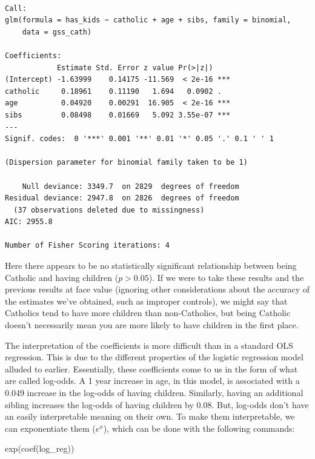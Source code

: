 \documentclass[
  letterpaper,
]{book}
\newenvironment{Shaded}{\begin{snugshade}}{\end{snugshade}}
\newcommand{\FunctionTok}[1]{\textcolor[rgb]{0.28,0.35,0.67}{#1}}
\newcommand{\NormalTok}[1]{\textcolor[rgb]{0.00,0.23,0.31}{#1}}
\begin{document}
\begin{verbatim}

Call:
glm(formula = has_kids ~ catholic + age + sibs, family = binomial, 
    data = gss_cath)

Coefficients:
            Estimate Std. Error z value Pr(>|z|)    
(Intercept) -1.63999    0.14175 -11.569  < 2e-16 ***
catholic     0.18961    0.11190   1.694   0.0902 .  
age          0.04920    0.00291  16.905  < 2e-16 ***
sibs         0.08498    0.01669   5.092 3.55e-07 ***
---
Signif. codes:  0 '***' 0.001 '**' 0.01 '*' 0.05 '.' 0.1 ' ' 1

(Dispersion parameter for binomial family taken to be 1)

    Null deviance: 3349.7  on 2829  degrees of freedom
Residual deviance: 2947.8  on 2826  degrees of freedom
  (37 observations deleted due to missingness)
AIC: 2955.8

Number of Fisher Scoring iterations: 4
\end{verbatim}

Here there appears to be no statistically significant relationship
between being Catholic and having children (\(p > 0.05\)). If we were to
take these results and the previous results at face value (ignoring
other considerations about the accuracy of the estimates we've obtained,
such as improper controls), we might say that Catholics tend to have
more children than non-Catholics, but being Catholic doesn't necessarily
mean you are more likely to have children in the first place.

The interpretation of the coefficients is more difficult than in a
standard OLS regression. This is due to the different properties of the
logistic regression model alluded to earlier. Essentially, these
coefficients come to us in the form of what are called log-odds. A 1
year increase in age, in this model, is associated with a 0.049 increase
in the log-odds of having children. Similarly, having an additional
sibling increases the log-odds of having children by 0.08. But, log-odds
don't have an easily interpretable meaning on their own. To make them
interpretable, we can exponentiate them (\(e^x\)), which can be done
with the following commands:

\begin{Shaded}
\begin{Highlighting}[]
\FunctionTok{exp}\NormalTok{(}\FunctionTok{coef}\NormalTok{(log\_reg))}
\end{Highlighting}
\end{Shaded}
\end{document}
